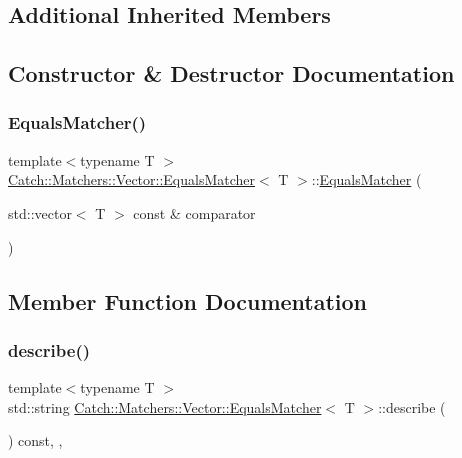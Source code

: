 \subsection*{Additional Inherited Members}


\subsection{Constructor \& Destructor Documentation}
\mbox{\label{struct_catch_1_1_matchers_1_1_vector_1_1_equals_matcher_a3846c47780d1991dcfe87aefded98008}} 
\subsubsection{\texorpdfstring{EqualsMatcher()}{EqualsMatcher()}}
{\footnotesize\ttfamily template$<$typename T $>$ \\
\mbox{\hyperlink{struct_catch_1_1_matchers_1_1_vector_1_1_equals_matcher}{Catch\+::\+Matchers\+::\+Vector\+::\+Equals\+Matcher}}$<$ T $>$\+::\mbox{\hyperlink{struct_catch_1_1_matchers_1_1_vector_1_1_equals_matcher}{Equals\+Matcher}} (\begin{DoxyParamCaption}\item[{std\+::vector$<$ T $>$ const \&}]{comparator }\end{DoxyParamCaption})\hspace{0.3cm}{\ttfamily [inline]}}



\subsection{Member Function Documentation}
\mbox{\label{struct_catch_1_1_matchers_1_1_vector_1_1_equals_matcher_a36b5f7ecada4081d6c65bebe8ddea6f4}} 
\subsubsection{\texorpdfstring{describe()}{describe()}}
{\footnotesize\ttfamily template$<$typename T $>$ \\
std\+::string \mbox{\hyperlink{struct_catch_1_1_matchers_1_1_vector_1_1_equals_matcher}{Catch\+::\+Matchers\+::\+Vector\+::\+Equals\+Matcher}}$<$ T $>$\+::describe (\begin{DoxyParamCaption}{ }\end{DoxyParamCaption}) const\hspace{0.3cm}{\ttfamily [inline]}, {\ttfamily [override]}, {\ttfamily [virtual]}}



